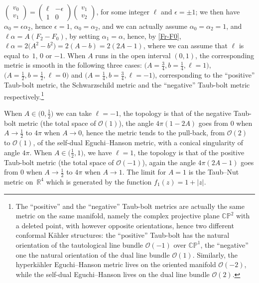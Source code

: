 \documentclass[pdftex]{sigma}
\numberwithin{equation}{section}
\begin{document}
 $\left(\begin{smallmatrix} v_0 \\ v_1\end{smallmatrix}\right) = \left(\begin{smallmatrix} \ell & - \epsilon \\ 1 & 0 \end{smallmatrix}\right) \left(\begin{smallmatrix} v_1 \\ v_2 \end{smallmatrix}\right)$, for some integer $\ell$ and $\epsilon = \pm 1$; we then have $\alpha _0 = \epsilon \alpha _2$, hence $\epsilon = 1$, $\alpha _0 = \alpha _2$, and we can actually assume $\alpha _0 = \alpha _2 = 1$, and $\ell \alpha = A (F _2 - F_0)$, by setting $\alpha _1 = \alpha$, hence, by \eqref{Fr-F0}, $\ell \alpha = 2 \big(A^2 - b^2\big) = 2 (A - b) = 2 (2 A - 1)$, where we can assume that $\ell$ is equal to~$1$, $0$ or $-1$. When $A$ runs in the open interval $(0, 1)$, the corresponding metric is smooth in the following three cases: $\big(A = \frac{3}{4}, b = \frac{1}{4}, \ell = 1\big)$, $\big(A = \frac{1}{2}, b = \frac{1}{2}, \ell = 0\big)$ and $\big(A = \frac{1}{4}, b = \frac{3}{4}, \ell = -1\big)$, corresponding to the ``positive'' Taub-bolt metric, the Schwarzschild metric and the ``negative'' Taub-bolt metric respectively.\footnote{The ``positive'' and the ``negative'' Taub-bolt metrics are actually the same metric on the same manifold, namely the complex projective plane $\mathbb{CP}^2$ with a deleted point, with however opposite orientations, hence two different conformal K\"ahler structures: the ``positive'' Taub-bolt has the natural orientation of the tautological line bundle $\mathcal{O}(-1)$ over $\mathbb{CP} ^1$, the ``negative'' one the natural orientation of the dual line bundle $\mathcal{O}(1)$. Similarly, the hyperk\"ahler Eguchi--Hanson metric lives on the oriented manifold $\mathcal{O} (- 2)$, while the self-dual Eguchi--Hanson lives on the dual line bundle $\mathcal{O}(2)$.}

 When $A\in\big(0,\frac12\big)$ we can take $\ell=-1$, the topology is that of the negative Taub-bolt metric (the total space of $\mathcal{O}(1)$), the angle $4\pi(1-2A)$ goes from $0$ when $A\rightarrow\frac12$ to $4\pi$ when $A\rightarrow0$, hence the metric tends to the pull-back, from $\mathcal{O}(2)$ to $\mathcal{O}(1)$, of the self-dual Eguchi--Hanson metric, with a conical singularity of angle $4 \pi$. When $A\in\big(\frac12,1\big)$, we have $\ell=1$, the topology is that of the positive Taub-bolt metric (the total space of $\mathcal{O}(-1)$), again the angle $4\pi(2A-1)$ goes from $0$ when $A\rightarrow\frac12$ to $4\pi$ when $A\rightarrow1$. The limit for $A=1$ is the Taub--Nut metric on~$\mathbb{R}^4$ which is generated by the function $f_1(z)=1+|z|$.
\end{document}
